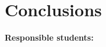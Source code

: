 \section{Conclusions}
\label{section:conclusion}


\textbf{Responsible students:}



\begin{comment}
In this section, you should summarise the report and present the conclusions and final analysis. Give a brief overview of the purpose and the research question. You should then clearly state the main findings, explain their significance and put them into context. All conclusions should be supported by previous sections of the report.  However, you should not present new details. 

An expert should be able to read this section independently of the rest of the report. 
\end{comment}

